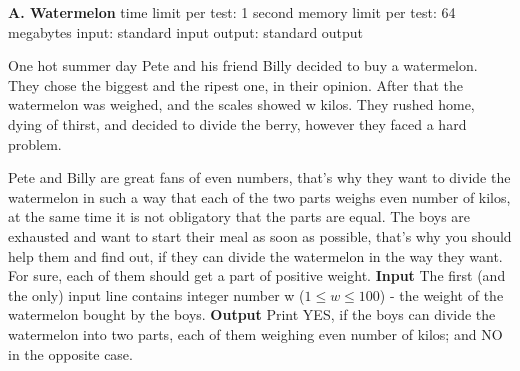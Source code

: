 \documentclass[11pt]{article}
\begin{document}
    \begin{center}
        \textbf{A. Watermelon}
        \newline
        time limit per test: 1 second
        \newline
        memory limit per test: 64 megabytes
        \newline
        input: standard input
        \newline
        output: standard output
        \newline
    \end{center}
    One hot summer day Pete and his friend Billy decided to buy a watermelon.
    They chose the biggest and the ripest one, in their opinion.
    After that the watermelon was weighed, and the scales showed w kilos.
    They rushed home, dying of thirst, and decided to divide the berry, however they faced a hard problem.

    Pete and Billy are great fans of even numbers, that's why they want to divide the watermelon in such a way that each of the two parts weighs even number of kilos, at the same time it is not obligatory that the parts are equal.
    The boys are exhausted and want to start their meal as soon as possible, that's why you should help them and find out, if they can divide the watermelon in the way they want.
    For sure, each of them should get a part of positive weight.
    \newline
    \newline
    \textbf{Input}
    \newline
    The first (and the only) input line contains integer number w ($1 \leq w \leq 100$) - the weight of the watermelon bought by the boys.
    \newline
    \newline
    \textbf{Output}
    \newline
    Print YES, if the boys can divide the watermelon into two parts, each of them weighing even number of kilos;
    and NO in the opposite case.
\end{document}
